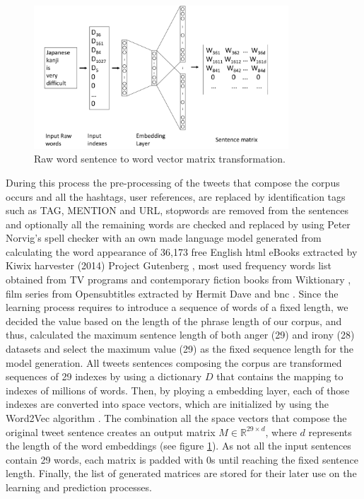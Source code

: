 \begin{figure}[!htp]
  \center
  \includegraphics[width=0.85\textwidth]{figures/raw_text_word_vector_transformation}
  \caption{Raw word sentence to word vector matrix transformation.}
  \label{fig:raw_text_word_vector_transformation}
\end{figure}

During this process the pre-processing of the tweets that compose the corpus occurs and all the hashtags, user references,  are replaced by identification tags such as TAG, MENTION and URL, stopwords are removed from the sentences and optionally all the remaining words are checked and replaced by using Peter Norvig's spell checker \cite{PeterNorvigSpell} with an own made language model generated from calculating the word appearance of 36,173 free English \acrshort{html} eBooks extracted by Kiwix harvester (2014) \cite{kiwix} Project Gutenberg \cite{projectGutenberg}, most used frequency words list obtained from TV programs and contemporary fiction books from Wiktionary \cite{WiktionaryFL}, film series from Opensubtitles extracted by Hermit Dave \cite{openSubtitlesFL} and \acrfull{bnc} \cite{bncFLAdamK}. Since the learning process requires to introduce a sequence of words of a fixed length, we decided the value based on the length of the phrase length of our corpus, and thus, calculated the maximum sentence length of both anger (29) and irony (28) datasets and select the maximum value (29) as the fixed sequence length for the model generation. All tweets sentences composing the corpus are transformed sequences of 29 indexes by using a dictionary $D$ that contains the mapping to indexes of millions of words. Then, by ploying a embedding layer, each of those indexes are converted into space vectors, which are initialized by using the Word2Vec algorithm \cite{mikolov2013efficient}. The combination all the space vectors that compose the original tweet sentence creates an output matrix $M\in\mathbb{R}^{29 \times d}$, where $d$ represents the length of the word embeddings (see figure \ref{fig:raw_text_word_vector_transformation}). As not all the input sentences contain 29 words, each matrix is padded with 0s until reaching the fixed sentence length. Finally, the list of generated matrices are stored for their later use on the learning and prediction processes.


